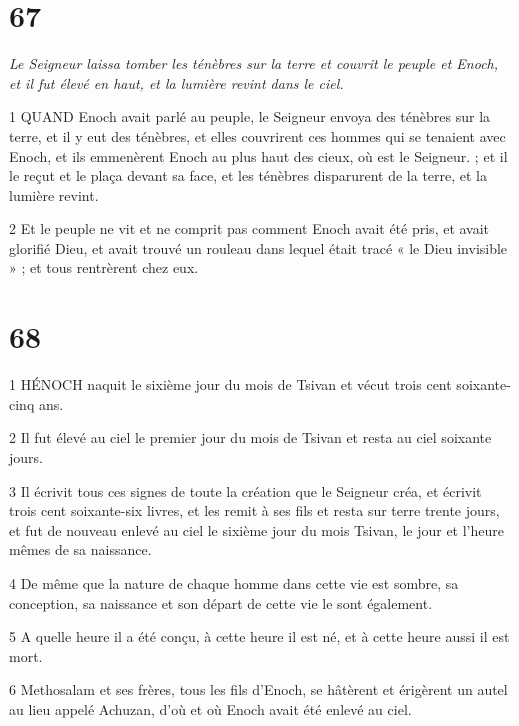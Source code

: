 \chapter{67}

\par \textit{Le Seigneur laissa tomber les ténèbres sur la terre et couvrit le peuple et Enoch, et il fut élevé en haut, et la lumière revint dans le ciel.}

\par 1 QUAND Enoch avait parlé au peuple, le Seigneur envoya des ténèbres sur la terre, et il y eut des ténèbres, et elles couvrirent ces hommes qui se tenaient avec Enoch, et ils emmenèrent Enoch au plus haut des cieux, où est le Seigneur. ; et il le reçut et le plaça devant sa face, et les ténèbres disparurent de la terre, et la lumière revint.

\par 2 Et le peuple ne vit et ne comprit pas comment Enoch avait été pris, et avait glorifié Dieu, et avait trouvé un rouleau dans lequel était tracé « le Dieu invisible » ; et tous rentrèrent chez eux.

\chapter{68}

\par 1 HÉNOCH naquit le sixième jour du mois de Tsivan et vécut trois cent soixante-cinq ans.

\par 2 Il fut élevé au ciel le premier jour du mois de Tsivan et resta au ciel soixante jours.

\par 3 Il écrivit tous ces signes de toute la création que le Seigneur créa, et écrivit trois cent soixante-six livres, et les remit à ses fils et resta sur terre trente jours, et fut de nouveau enlevé au ciel le sixième jour du mois Tsivan, le jour et l'heure mêmes de sa naissance.

\par 4 De même que la nature de chaque homme dans cette vie est sombre, sa conception, sa naissance et son départ de cette vie le sont également.

\par 5 A quelle heure il a été conçu, à cette heure il est né, et à cette heure aussi il est mort.

\par 6 Methosalam et ses frères, tous les fils d'Enoch, se hâtèrent et érigèrent un autel au lieu appelé Achuzan, d'où et où Enoch avait été enlevé au ciel.

